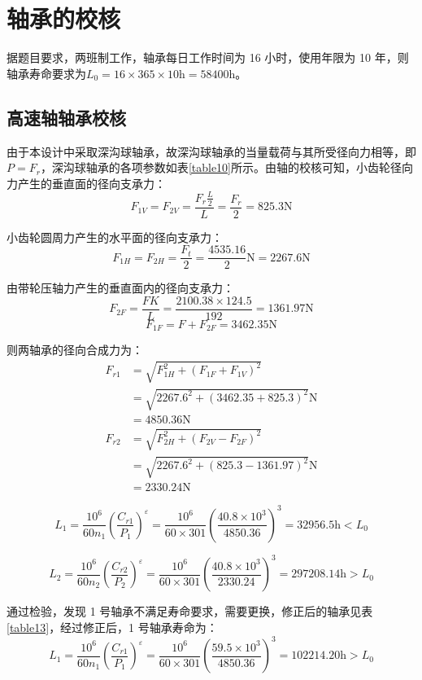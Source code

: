 \documentclass[12pt]{ctexart}
\begin{document}
\section{轴承的校核}

据题目要求，两班制工作，轴承每日工作时间为 16 小时，使用年限为 10 年，则轴承寿命要求为$L_0=16\times 365\times 10 \text{h}= 58400\text{h}$。


\subsection{高速轴轴承校核}

由于本设计中采取深沟球轴承，故深沟球轴承的当量载荷与其所受径向力相等，即$P=F_r$，深沟球轴承的各项参数如表\ref{table10}所示。由轴的校核可知，小齿轮径向力产生的垂直面的径向支承力：
$$F_{1V}=F_{2V}=\frac{F_r\frac{L}{2}}{L}=\frac{F_r}{2}=825.3\text{N}$$

小齿轮圆周力产生的水平面的径向支承力：
$$F_{1H}=F_{2H}=\frac{F_t}{2}=\frac{4535.16}{2}\text{N}=2267.6\text{N}$$

由带轮压轴力产生的垂直面内的径向支承力：
$$F_{2F}=\frac{FK}{L}=\frac{2100.38\times 124.5}{192}=1361.97\text{N}$$
$$F_{1F}=F+F_{2F}=3462.35\text{N}$$

则两轴承的径向合成力为：
\begin{align*}
    F_{r1} & =\sqrt{F_{1H}^2+(F_{1F}+F_{1V})^2}\\
        & = \sqrt{2267.6^2+(3462.35+825.3)^2}\text{N}\\
        & = 4850.36\text{N}\\
    F_{r2} & =\sqrt{F_{2H}^2+(F_{2V}-F_{2F})^2}\\
        & = \sqrt{2267.6^2+(825.3-1361.97)^2}\text{N}\\
        & = 2330.24\text{N}
\end{align*}


$$L_{1}=
\frac{10^6}{60n_1}\left(\frac{C_{r1}}{P_1}\right)^\varepsilon 
= \frac{10^6}{60\times 301}\left(\frac{40.8\times 10^3}{4850.36}\right)^3
=32956.5\text{h}<L_0$$

$$L_{2}=
\frac{10^6}{60n_2}\left(\frac{C_{r2}}{P_2}\right)^\varepsilon 
= \frac{10^6}{60\times 301}\left(\frac{40.8\times 10^3}{2330.24}\right)^3
=297208.14\text{h}>L_0$$

通过检验，发现 1 号轴承不满足寿命要求，需要更换，修正后的轴承见表\ref{table13}，经过修正后，1 号轴承寿命为：
$$L_{1}=
\frac{10^6}{60n_1}\left(\frac{C_{r1}}{P_1}\right)^\varepsilon 
= \frac{10^6}{60\times 301}\left(\frac{59.5\times 10^3}{4850.36}\right)^3
=102214.20\text{h}>L_0$$
\end{document}
